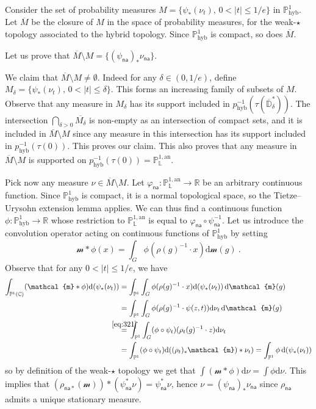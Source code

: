 \documentclass[11pt]{article}
\theoremstyle{definition}
\numberwithin{equation}{section}
\numberwithin{figure}{section}
\numberwithin{table}{section}
\DeclareMathOperator{\hyb}{hyb}
\newcommand{\cc}{\mathbb{C}}
\newcommand{\phyb}{{\mathbb{P}^1_{\mathrm{hyb}}}}
\newcommand{\sm}{\mathcal{m}}
\newcommand{\R}{{\mathbb R}}
\newcommand{\D}{\mathbb{D}}
\newcommand{\an}{\mathrm{an}}
\newcommand{\PP}{\mathbb{P}}
\newcommand{\Laurent}{\mathbb{L}}
\newcommand{\na}{\mathsf{na}}
\newcommand{\inv}{^{-1}}
\newcommand*{\dd}{\mathrm{d}}
\newcommand*{\dnu}{\dd \nu}
\newcommand*{\dsm}{\dd \sm}
\begin{document}
Consider the set of probability measures $M = \{ \psi_*(\nu_t), \, 0 < |t| \le 1/e\}$ in $\phyb$. Let $\overline{M}$ be the closure of $M$ in the space of probability measures, for the weak-$\star$ topology associated to the hybrid topology. Since $\PP^{1}_{\hyb}$ is compact, so does $\overline{M}$.

Let us prove that $\overline{M} \setminus M = \{(\psi_\na)_* \nu_{\na}\}$.

We claim that $\overline{M} \setminus M\neq \emptyset$. Indeed for any $\delta \in (0, 1/e)$, define $M_\delta =\{ \psi_*(\nu_t), \, 0 < |t| \le \delta\}$. This forms an increasing family of subsets of $M$. Observe that any measure in $M_\delta$ has its support included in $p_{\hyb}^{-1}(\tau(\overline{\D}^*_\delta))$. The intersection $\bigcap_{\delta>0} \overline{M_\delta}$ is non-empty as an intersection of compact sets, and it is included in $\overline{M} \setminus M$ since any measure in this intersection has its support included in $p_{\hyb}^{-1}(\tau(0))$. This proves our claim. This also proves that any measure in $\overline{M} \setminus M$ is supported on $p_{\hyb}^{-1}(\tau(0)) = \PP^{1,\an}_{\Laurent}$.

Pick now any measure $\nu \in \overline{M} \setminus M$. Let $\varphi_{\na} : \PP^{1,\an}_{\Laurent} \to \R$ be an arbitrary continuous function. Since $\phyb$ is compact, it is a normal topological space, so the Tietze--Urysohn extension lemma applies. We can thus find a continuous function $\phi: \phyb \to \R$ whose restriction to $\PP^{1,\an}_{\Laurent}$ is equal to $\varphi_{\na}\circ \psi_\na\inv$. Let us introduce the convolution operator acting on continuous functions of $\phyb$ by setting
\[
\sm \ast \phi (x) = \int_G \phi(\rho(g)^{-1} \cdot x) \dsm(g)~.
\]
Observe that for any $0 < |t| \le 1/e$, we have
\begin{align*}
\int_{\PP^1(\cc)} (\sm \ast \phi) \dd(\psi_*(\nu_t)) &=
\int_{\PP^1} \int_G \phi(\rho(g)^{-1} \cdot x) \dd(\psi_*(\nu_t)) \, \dsm(g)
\\ & = \int_{\PP^1} \int_G \phi(\rho(g) ^{-1} \cdot \psi(z,t)) \dnu_t \, \dsm(g)
\\
& \overset{\mathclap{\eqref{eq:321}}}{=}\, \int_{\PP^1} \int_G (\phi \circ \psi_t) (\rho_t(g)^{-1} \cdot z) \dnu_t
\\ &= \int_{\PP^1} (\phi \circ \psi_t) \dd((\rho_t)_*\sm) * \nu_t) = \int_{\PP^1} \phi \, \dd(\psi_{*}(\nu_t))
\end{align*}
so by definition of the weak-$\star$ topology we get that $\int (\sm \ast \phi) \dnu= \int \phi \dnu$. This implies that $(\rho_{\na*}(\sm)) \ast (\psi_\na^*\nu) = \psi_\na^*\nu$, hence $\nu = (\psi_\na)_*\nu_{\na}$ since $\rho_{\na}$ admits a unique stationary measure.
\end{document}
